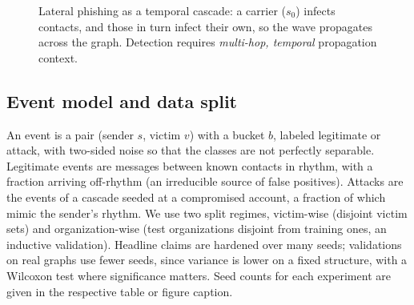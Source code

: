 \begin{figure}[pos=tbp]\centering
{}
\caption[Lateral phishing as a temporal cascade]{Lateral phishing as a temporal cascade: a carrier ($s_0$)
infects contacts, and those in turn infect their own, so the wave propagates across the graph. Detection requires \emph{multi-hop,
temporal} propagation context.}
\label{fig:cascade}
\end{figure}

\subsection{Event model and data split}
\label{sec:m-events}
An event is a pair (sender $s$, victim $v$) with a bucket $b$, labeled legitimate or attack, with two-sided noise so
that the classes are not perfectly separable. Legitimate events are messages between known contacts in rhythm,
with a fraction arriving off-rhythm (an irreducible source of false positives). Attacks are the events of a
cascade seeded at a compromised account, a fraction of which mimic the sender's rhythm. We use two split
regimes, victim-wise (disjoint victim sets) and organization-wise (test organizations disjoint from training
ones, an inductive validation). Headline claims are hardened over many seeds; validations on real graphs use
fewer seeds, since variance is lower on a fixed structure, with a Wilcoxon test where significance matters.
Seed counts for each experiment are given in the respective table or figure caption.

